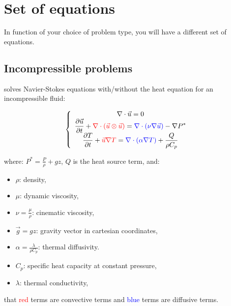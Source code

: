 \section{Set of equations}
In function of your choice of problem type, you will have a different set of equations.

\subsection{Incompressible problems}
\trust solves Navier-Stokes equations with/without the heat equation for an incompressible fluid:

$$
\left\{
\begin{array}{c}
\nabla \cdot \vec u =0 \\
\displaystyle{\frac{\partial \vec u }{\partial t} + \textcolor{red}{\nabla \cdot (\vec u \otimes \vec u)} = \textcolor{blue}{\nabla \cdot (\nu \nabla \vec u)} - \nabla P^* } \\
\displaystyle{\frac{\partial T}{\partial t} + \textcolor{red}{\vec u \nabla T} = \textcolor{blue}{\nabla \cdot (\alpha \nabla T)} + \frac{Q}{\rho C_p}}
\end{array}
\right.
$$

where: $\displaystyle{P^*=\frac{P}{\rho} + g z}$, $Q$ is the heat source term, and:

\begin{itemize}
\item $\rho$: density,
\item $\mu$: dynamic viscosity,
\item $\displaystyle{\nu=\frac{\mu}{\rho}}$: cinematic viscosity,
\item $\vec g=g z$: gravity vector in cartesian coordinates,
\item $\displaystyle{\alpha=\frac{\lambda}{\rho C_p}}$: thermal diffusivity.
\item $C_p$: specific heat capacity at constant pressure,
\item $\lambda$: thermal conductivity,
\end{itemize}

\Note that \textcolor{red}{red} terms are convective terms and \textcolor{blue}{blue} terms are diffusive terms.\\

